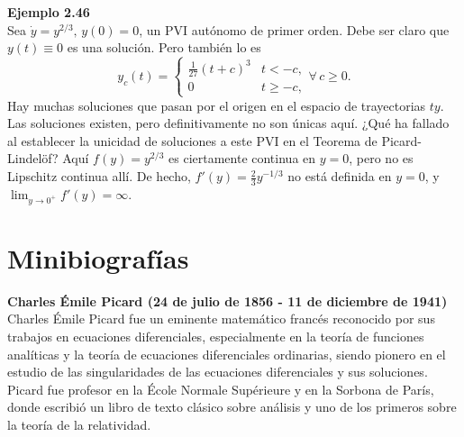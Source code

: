\begin{mdframed}[style=warning]
	\begin{tcolorbox}[arc=0mm,boxrule=0pt,colframe=white,colback=lightgray!25]
		{\large \textbf{Ejemplo 2.46}} \\
		Sea $\dot{y} = y^{2/3},\, y(0) = 0$, un PVI autónomo de primer orden. Debe ser claro que $y(t) \equiv 0$ es una solución. Pero también lo es
			$$
				y_c (t) = \left\{\begin{array}{cc}
								\frac{1}{27} (t + c)^3 & t < -c, \\
								0 & t\geq -c, 		
							\end{array}\right.
				\forall \, c\geq 0.				
			$$
		Hay muchas soluciones que pasan por el origen en el espacio de trayectorias $ty$. Las soluciones existen, pero definitivamente no son únicas aquí. ¿Qué ha fallado al establecer la unicidad de soluciones a este PVI en el Teorema de Picard-Lindelöf? Aquí $f(y) = y^{2/3}$ es ciertamente continua en $y = 0$, pero no es Lipschitz continua allí. De hecho, $f'(y) = \frac{2}{3} y^{-1/3}$ no está definida en $y = 0$, y $\displaystyle\lim _{y\to 0^+} f'(y) = \infty$.
	\end{tcolorbox}
\end{mdframed}



\section*{Minibiografías}



\begin{mdframed}[style=warning]
	\begin{tcolorbox}[arc=0mm,boxrule=0pt,colframe=white,colback=lightgray!25]
		{\large \textbf{Charles Émile Picard (24 de julio de 1856 - 11 de diciembre de 1941)}} \\
		Charles Émile Picard fue un eminente matemático francés reconocido por sus trabajos en ecuaciones diferenciales, especialmente en la teoría de funciones analíticas y la teoría de ecuaciones diferenciales ordinarias, siendo pionero en el estudio de las singularidades de las ecuaciones diferenciales y sus soluciones. \\
		
		Picard fue profesor en la École Normale Supérieure y en la Sorbona de París, donde escribió un libro de texto clásico sobre análisis y uno de los primeros sobre la teoría de la relatividad.
	\end{tcolorbox}
\end{mdframed}






